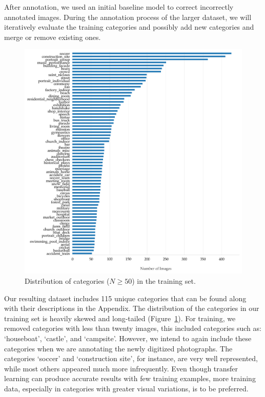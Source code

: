 \documentclass[a4paper,twoside]{article}
\begin{document}
After annotation, we used an initial baseline model to correct incorrectly annotated images. 
During the annotation process of the larger dataset, we will iteratively evaluate the training categories and possibly add new categories and merge or remove existing ones.
%
\begin{figure}
 \includegraphics[width=\linewidth]{figures/categories.png}
 \caption{Distribution of categories ($N \geqslant50$) in the training set.}
 \label{fig:categories}
\end{figure}
%
Our resulting dataset includes 115 unique categories that can be found along with their descriptions in the Appendix.  
The distribution of the categories in our training set is heavily skewed and long-tailed (Figure~\ref{fig:categories}). 
For training, we removed categories with less than twenty images, this included categories such as: `houseboat', `castle', and `campsite'. 
However, we intend to again include these categories when we are annotating the newly digitized photographs.
The categories `soccer' and `construction site', for instance, are very well represented, while most others appeared much more infrequently. 
Even though transfer learning can produce accurate results with few training examples, more training data, especially in categories with greater visual variations, is to be preferred. 
\end{document}
